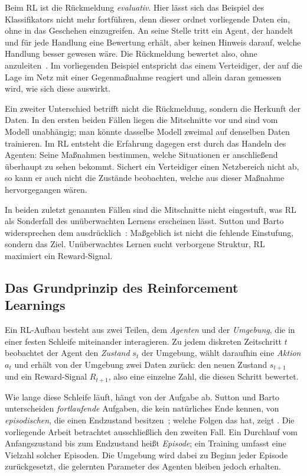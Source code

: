 Beim \ac{RL} ist die Rückmeldung \emph{evaluativ}. Hier lässt sich das Beispiel
des Klassifikators nicht mehr fortführen, denn dieser ordnet vorliegende Daten
ein, ohne in das Geschehen einzugreifen. An seine Stelle tritt ein Agent,
der handelt und für jede Handlung eine Bewertung erhält, aber keinen Hinweis
darauf, welche Handlung besser gewesen wäre. Die Rückmeldung bewertet also, ohne
anzuleiten~\cite[S.~25]{suttonbarto2018}. Im vorliegenden Beispiel entspricht das einem Verteidiger, der auf
die Lage im Netz mit einer Gegenmaßnahme reagiert und allein daran gemessen
wird, wie sich diese auswirkt.

Ein zweiter Unterschied betrifft nicht die Rückmeldung, sondern die Herkunft
der Daten. In den ersten beiden Fällen liegen die Mitschnitte vor und sind vom
Modell unabhängig; man könnte dasselbe Modell zweimal auf denselben Daten
trainieren. Im \ac{RL} entsteht die Erfahrung dagegen erst durch das Handeln
des Agenten: Seine Maßnahmen bestimmen, welche Situationen er anschließend
überhaupt zu sehen bekommt. Sichert ein Verteidiger einen Netzbereich nicht
ab, so kann er auch nicht die Zustände beobachten, welche aus dieser Maßnahme
hervorgegangen wären.

In beiden zuletzt genannten Fällen sind die Mitschnitte nicht eingestuft, was
\ac{RL} als Sonderfall des unüberwachten Lernens erscheinen lässt. Sutton und
Barto widersprechen dem ausdrücklich~\cite[Abschn.~1.1]{suttonbarto2018}:
Maßgeblich ist nicht die fehlende Einstufung, sondern das Ziel. Unüberwachtes
Lernen sucht verborgene Struktur, \ac{RL} maximiert ein Reward-Signal.

\subsection{Das Grundprinzip des Reinforcement Learnings}
\label{sec:rl-grundprinzip}

Ein \ac{RL}-Aufbau besteht aus zwei Teilen, dem \emph{Agenten} und der
\emph{Umgebung}, die in einer festen Schleife miteinander interagieren. Zu jedem
diskreten Zeitschritt $t$ beobachtet der Agent den \emph{Zustand} $s_t$ der
Umgebung, wählt daraufhin eine \emph{Aktion} $a_t$ und erhält von der Umgebung
zwei Daten zurück: den neuen Zustand $s_{t+1}$ und ein Reward-Signal $R_{t+1}$,
also eine einzelne Zahl, die diesen Schritt bewertet.

Wie lange diese Schleife läuft, hängt von der Aufgabe ab. Sutton und Barto
unterscheiden \emph{fortlaufende} Aufgaben, die kein natürliches Ende kennen,
von \emph{episodischen}, die einen Endzustand
besitzen~\cite[Abschn.~3.3]{suttonbarto2018}; welche Folgen das hat, zeigt
. Die vorliegende Arbeit betrachtet ausschließlich den zweiten
Fall. Ein Durchlauf vom Anfangszustand bis zum Endzustand heißt \emph{Episode};
ein Training umfasst eine Vielzahl solcher Episoden. Die Umgebung wird dabei
zu Beginn jeder Episode zurückgesetzt, die gelernten Parameter des Agenten
bleiben jedoch erhalten.

